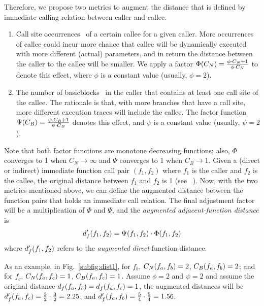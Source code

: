 Therefore, we propose two metrics to augment the distance that is defined by immediate calling relation between caller and callee.
\begin{enumerate}[(1)] 
\item Call site occurrences \csnum~of a certain callee for a given caller. More occurrences of callee could incur more chance that callee will be dynamically executed with more different (actual) parameters, and in return the distance between the caller to the callee will be smaller. We apply a factor $\Phi(C_N)=\frac{\phi\cdot C_N+1}{\phi\cdot C_N}$ to denote this effect, where $\phi$ is a constant value (usually, $\phi=2$).
\item The number of basicblocks \csbb~in the caller that contains at least one call site of the callee. The rationale is that, with more branches that have a call site, more different execution traces will include the callee. The factor function $\Psi(C_B)=\frac{\psi\cdot C_B+1}{\psi\cdot C_B}$ denotes this effect, and $\psi$ is a constant value (usually, $\psi=2$).
\end{enumerate}

Note that both factor functions are monotone decreasing functions; also, $\Phi$ converges to 1 when $C_N\rightarrow\infty$ and $\Psi$ converges to 1 when $C_B\rightarrow 1$.
Given a (direct or indirect) immediate function call pair $( f_1, f_2)$ where $f_1$ is the caller and $f_2$ is the callee, the original distance between $f_1$ and $f_2$ is 1 (see \aflgo~\cite{Bohme:2017:DGF}). Now, with the two metrics mentioned above, we can define the augmented distance between the function pairs that holds an immediate call relation. The final adjustment factor will be a multiplication of $\Phi$ and $\Psi$, and the \emph{augmented adjacent-function distance} is
\begin{equation}
 d^{\prime}_f(f_1,f_2) =  \Psi(f_1, f_2)\cdot\Phi(f_1, f_2)
\end{equation}
where $d^{\prime}_f(f_1,f_2)$ refers to the \emph{augmented} \emph{direct} function distance. 

As an example, in Fig.~\ref{subfig:dist1}, for $f_b$, $C_N(f_a, f_b)=2$, $C_B(f_a, f_b)=2$; and for $f_c$, $C_N(f_a, f_c)=1$, $C_B(f_a, f_c)=1$. Assume $\phi=2$ and $\psi=2$ and assume the original distance $d_f(f_a,f_b)=d_f(f_a,f_c)=1$, the augmented distances will be $d^{\prime}_f(f_a,f_c)=\frac{3}{2}\cdot\frac{3}{2}=2.25$, and $d^{\prime}_f(f_a,f_b)=\frac{5}{4}\cdot\frac{5}{4}=1.56$.



